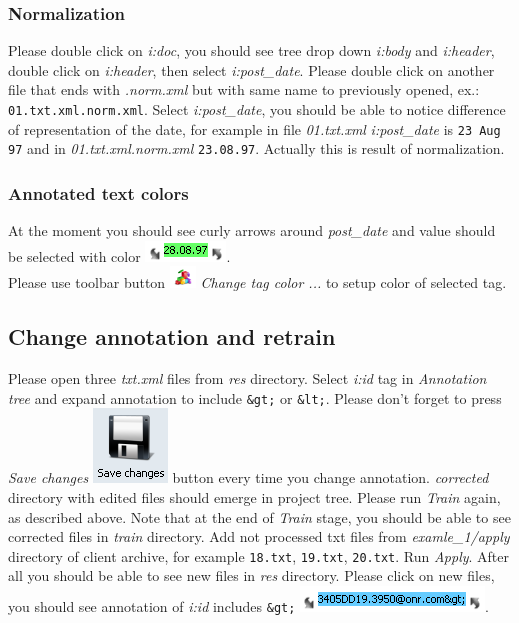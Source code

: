\documentclass[12pt]{article}
\begin{document}
\subsubsection{Normalization}
Please double click on \emph{i:doc}, you should see tree drop down \emph{i:body} and \emph{i:header}, double click on \emph{i:header}, then select \emph{i:post\_date}.
Please double click on another file that ends with \emph{.norm.xml} but with same name to previously opened, ex.: \texttt{01.txt.xml.norm.xml}. Select \emph{i:post\_date}, you should be able to notice difference of representation of the date, for example in file \emph{01.txt.xml} \emph{i:post\_date} is \texttt{23 Aug 97} and in \emph{01.txt.xml.norm.xml} \texttt{23.08.97}. Actually this is result of normalization.\\

\subsubsection{Annotated text colors}
At the moment you should see curly arrows around \emph{post\_date} and value should be selected with color \includegraphics[scale=1.0]{06AnnotatedText.png}.\\
Please use toolbar button \includegraphics[scale=1.0]{07ChangeTagColor.png} \emph{Change tag color ...}  to setup color of selected tag.

\subsection{Change annotation and retrain}
Please open three \emph{txt.xml} files from \emph{res} directory. Select \emph{i:id} tag in \emph{Annotation tree} and expand annotation to include \texttt{\&gt;} or \texttt{\&lt;}. Please don't forget to press \emph{Save changes} \includegraphics[scale=0.6]{11SaveChanges.png} button every time you change annotation. \emph{corrected} directory with edited files should emerge in project tree. Please run \emph{Train} again, as described above. Note that at the end of \emph{Train} stage, you should be able to see corrected files in \emph{train} directory. Add not processed txt files from \emph{examle\_1/apply} directory of client archive, for example \texttt{18.txt}, \texttt{19.txt}, \texttt{20.txt}. Run \emph{Apply}. After all you should be able to see new files in \emph{res} directory. Please click on new files, you should see annotation of \emph{i:id} includes \texttt{\&gt;} \includegraphics[scale=1.0]{08CorrectedAnnotation.png}.
\end{document}
